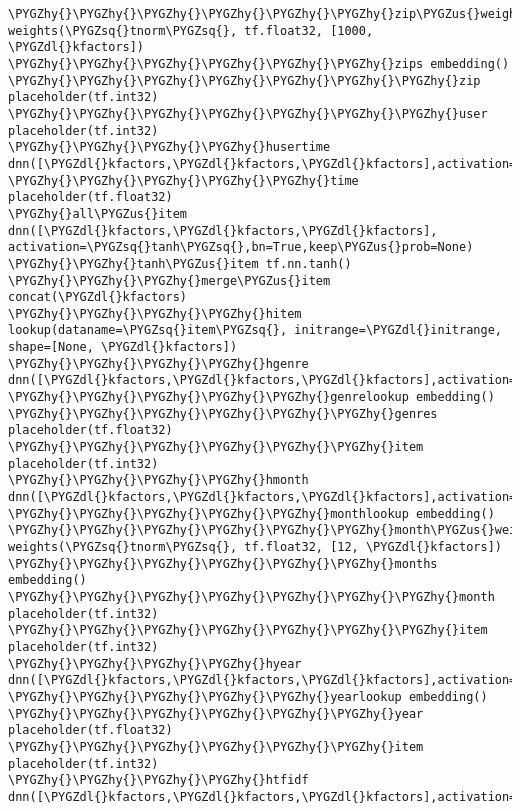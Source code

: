 \documentclass[letterpaper,10pt,english]{sphinxmanual}
\def\PYGZus{\char`\_}
\def\PYGZdl{\char`\$}
\def\PYGZhy{\char`\-}
\def\PYGZsq{\char`\'}
\renewcommand\PYGZsq{\textquotesingle}
\begin{document}
\begin{Verbatim}[commandchars=\\\{\}]
\PYGZhy{}\PYGZhy{}\PYGZhy{}\PYGZhy{}\PYGZhy{}\PYGZhy{}zip\PYGZus{}weights weights(\PYGZsq{}tnorm\PYGZsq{}, tf.float32, [1000, \PYGZdl{}kfactors])
\PYGZhy{}\PYGZhy{}\PYGZhy{}\PYGZhy{}\PYGZhy{}\PYGZhy{}zips embedding()
\PYGZhy{}\PYGZhy{}\PYGZhy{}\PYGZhy{}\PYGZhy{}\PYGZhy{}\PYGZhy{}zip placeholder(tf.int32)
\PYGZhy{}\PYGZhy{}\PYGZhy{}\PYGZhy{}\PYGZhy{}\PYGZhy{}\PYGZhy{}user placeholder(tf.int32)
\PYGZhy{}\PYGZhy{}\PYGZhy{}\PYGZhy{}husertime dnn([\PYGZdl{}kfactors,\PYGZdl{}kfactors,\PYGZdl{}kfactors],activation=\PYGZsq{}tanh\PYGZsq{},bn=True,keep\PYGZus{}prob=None)
\PYGZhy{}\PYGZhy{}\PYGZhy{}\PYGZhy{}\PYGZhy{}time placeholder(tf.float32)
\PYGZhy{}all\PYGZus{}item dnn([\PYGZdl{}kfactors,\PYGZdl{}kfactors,\PYGZdl{}kfactors], activation=\PYGZsq{}tanh\PYGZsq{},bn=True,keep\PYGZus{}prob=None)
\PYGZhy{}\PYGZhy{}tanh\PYGZus{}item tf.nn.tanh()
\PYGZhy{}\PYGZhy{}\PYGZhy{}merge\PYGZus{}item concat(\PYGZdl{}kfactors)
\PYGZhy{}\PYGZhy{}\PYGZhy{}\PYGZhy{}hitem lookup(dataname=\PYGZsq{}item\PYGZsq{}, initrange=\PYGZdl{}initrange, shape=[None, \PYGZdl{}kfactors])
\PYGZhy{}\PYGZhy{}\PYGZhy{}\PYGZhy{}hgenre dnn([\PYGZdl{}kfactors,\PYGZdl{}kfactors,\PYGZdl{}kfactors],activation=\PYGZsq{}tanh\PYGZsq{},bn=True,keep\PYGZus{}prob=None)
\PYGZhy{}\PYGZhy{}\PYGZhy{}\PYGZhy{}\PYGZhy{}genrelookup embedding()
\PYGZhy{}\PYGZhy{}\PYGZhy{}\PYGZhy{}\PYGZhy{}\PYGZhy{}genres placeholder(tf.float32)
\PYGZhy{}\PYGZhy{}\PYGZhy{}\PYGZhy{}\PYGZhy{}\PYGZhy{}item placeholder(tf.int32)
\PYGZhy{}\PYGZhy{}\PYGZhy{}\PYGZhy{}hmonth dnn([\PYGZdl{}kfactors,\PYGZdl{}kfactors,\PYGZdl{}kfactors],activation=\PYGZsq{}tanh\PYGZsq{},bn=True,keep\PYGZus{}prob=None)
\PYGZhy{}\PYGZhy{}\PYGZhy{}\PYGZhy{}\PYGZhy{}monthlookup embedding()
\PYGZhy{}\PYGZhy{}\PYGZhy{}\PYGZhy{}\PYGZhy{}\PYGZhy{}month\PYGZus{}weights weights(\PYGZsq{}tnorm\PYGZsq{}, tf.float32, [12, \PYGZdl{}kfactors])
\PYGZhy{}\PYGZhy{}\PYGZhy{}\PYGZhy{}\PYGZhy{}\PYGZhy{}months embedding()
\PYGZhy{}\PYGZhy{}\PYGZhy{}\PYGZhy{}\PYGZhy{}\PYGZhy{}\PYGZhy{}month placeholder(tf.int32)
\PYGZhy{}\PYGZhy{}\PYGZhy{}\PYGZhy{}\PYGZhy{}\PYGZhy{}\PYGZhy{}item placeholder(tf.int32)
\PYGZhy{}\PYGZhy{}\PYGZhy{}\PYGZhy{}hyear dnn([\PYGZdl{}kfactors,\PYGZdl{}kfactors,\PYGZdl{}kfactors],activation=\PYGZsq{}tanh\PYGZsq{},bn=True,keep\PYGZus{}prob=None)
\PYGZhy{}\PYGZhy{}\PYGZhy{}\PYGZhy{}\PYGZhy{}yearlookup embedding()
\PYGZhy{}\PYGZhy{}\PYGZhy{}\PYGZhy{}\PYGZhy{}\PYGZhy{}year placeholder(tf.float32)
\PYGZhy{}\PYGZhy{}\PYGZhy{}\PYGZhy{}\PYGZhy{}\PYGZhy{}item placeholder(tf.int32)
\PYGZhy{}\PYGZhy{}\PYGZhy{}\PYGZhy{}htfidf dnn([\PYGZdl{}kfactors,\PYGZdl{}kfactors,\PYGZdl{}kfactors],activation=\PYGZsq{}tanh\PYGZsq{},bn=True,keep\PYGZus{}prob=None)

\end{Verbatim}
\end{document}
